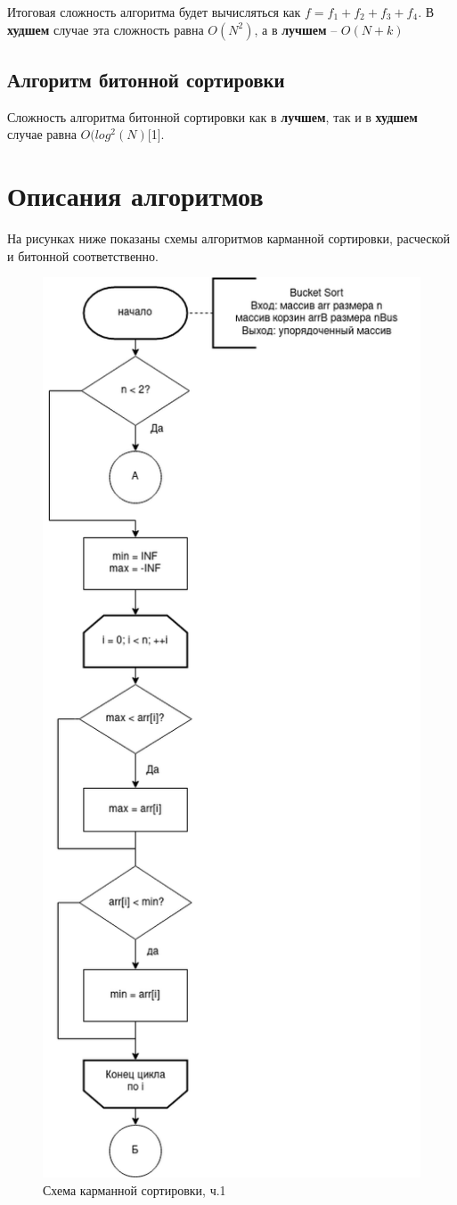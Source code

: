 \documentclass[12pt]{report}
\begin{document}
	Итоговая сложность алгоритма будет вычисляться как $f = f_{1} + f_{2} + f_{3} + f_{4}$. В \textbf{худшем} случае эта сложность равна $O(N^2)$, а в \textbf{лучшем} -- $O(N + k)$
	
	\subsection{Алгоритм битонной сортировки}
	
	Сложность алгоритма битонной сортировки как в \textbf{лучшем}, так и в \textbf{худшем} случае равна $O(log^{2}(N)$[1].
	
	\section{Описания алгоритмов}
	
	
	На рисунках ниже показаны схемы алгоритмов карманной сортировки, расческой и битонной соответственно.
	
	\begin{figure}[H]
		\centering
		\includegraphics[width=0.32\linewidth]{bucket_1}
		\caption{Схема карманной сортировки, ч.1}
		\label{fig:schema_bucket_1}
	\end{figure}
	
\end{document}

